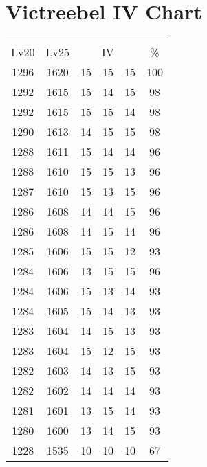 \documentclass{article}%
\begin{document}
%
\normalsize%
\section{Victreebel IV Chart}%
\label{sec:Victreebel IV Chart}%
\renewcommand{\arraystretch}{1.5}%
\begin{tabular}{|c|c|c|c|c|c|}%
\hline%
\multicolumn{6}{|c|}{\textcolor{white}{ 
\linebreak{Victreebel}
}%
\cellcolor{black}}\\%
\multicolumn{1}{|c}{Lv20}&\multicolumn{1}{c|}{Lv25}&\multicolumn{3}{c|}{IV}&\multicolumn{1}{|c|}{\%}\\%
\hline%
\rowcolor{color100}%
1296&1620&15&15&15&100\\%
\hline%
\rowcolor{color98}%
1292&1615&15&14&15&98\\%
\hline%
\rowcolor{color98}%
1292&1615&15&15&14&98\\%
\hline%
\rowcolor{color98}%
1290&1613&14&15&15&98\\%
\hline%
\rowcolor{color96}%
1288&1611&15&14&14&96\\%
\hline%
\rowcolor{color96}%
1288&1610&15&15&13&96\\%
\hline%
\rowcolor{color96}%
1287&1610&15&13&15&96\\%
\hline%
\rowcolor{color96}%
1286&1608&14&14&15&96\\%
\hline%
\rowcolor{color96}%
1286&1608&14&15&14&96\\%
\hline%
\rowcolor{color93}%
1285&1606&15&15&12&93\\%
\hline%
\rowcolor{color96}%
1284&1606&13&15&15&96\\%
\hline%
\rowcolor{color93}%
1284&1606&15&13&14&93\\%
\hline%
\rowcolor{color93}%
1284&1605&15&14&13&93\\%
\hline%
\rowcolor{color93}%
1283&1604&14&15&13&93\\%
\hline%
\rowcolor{color93}%
1283&1604&15&12&15&93\\%
\hline%
\rowcolor{color93}%
1282&1603&14&13&15&93\\%
\hline%
\rowcolor{color93}%
1282&1602&14&14&14&93\\%
\hline%
\rowcolor{color93}%
1281&1601&13&15&14&93\\%
\hline%
\rowcolor{color93}%
1280&1600&13&14&15&93\\%
\hline%
\rowcolor{color91}%
1228&1535&10&10&10&67\\%
\end{tabular}

%
\end{document}
